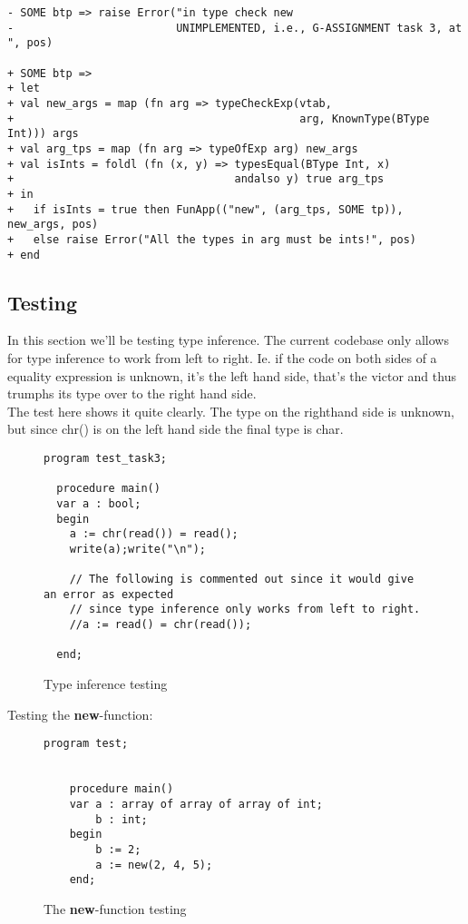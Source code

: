 \begin{lstlisting}[style=MLStyle]
- SOME btp => raise Error("in type check new 
-                         UNIMPLEMENTED, i.e., G-ASSIGNMENT task 3, at ", pos)

+ SOME btp => 
+ let
+ val new_args = map (fn arg => typeCheckExp(vtab,
+                                            arg, KnownType(BType Int))) args
+ val arg_tps = map (fn arg => typeOfExp arg) new_args
+ val isInts = foldl (fn (x, y) => typesEqual(BType Int, x) 
+                                  andalso y) true arg_tps 
+ in
+   if isInts = true then FunApp(("new", (arg_tps, SOME tp)), new_args, pos)
+   else raise Error("All the types in arg must be ints!", pos)
+ end
\end{lstlisting}
\subsection{Testing}
In this section we'll be testing type inference. The current codebase only
allows for type inference to work from left to right. Ie. if the code on both
sides of a equality expression is unknown, it's the left hand side, that's the
victor and thus trumphs its type over to the right hand side.\\
The test here shows it quite clearly. The type on the righthand side is unknown,
but since chr() is on the left hand side the final type is char.
\begin{figure}[H]
  \begin{lstlisting}[style=paladim]
  program test_task3;
  
  procedure main()
  var a : bool;
  begin
    a := chr(read()) = read();
    write(a);write("\n");
  
    // The following is commented out since it would give an error as expected
    // since type inference only works from left to right.
    //a := read() = chr(read());
  
  end;
  \end{lstlisting}
\caption{Type inference testing}
\end{figure}
Testing the \textbf{new}-function:
\begin{figure}[H]
  \begin{lstlisting}[style=paladim]
    program test;
    
    
    procedure main()
    var a : array of array of array of int;
        b : int;
    begin 
        b := 2;
        a := new(2, 4, 5);
    end;
  \end{lstlisting}
\caption{The \textbf{new}-function testing}
\end{figure}
